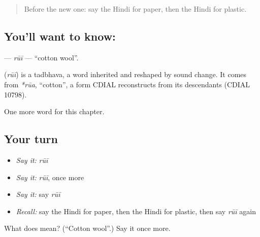 \label{lesson:HI-C246-rui}



\begin{quote}
Before the new one: say the Hindi for paper, then the Hindi for plastic.
\end{quote}

\subsection*{You'll want to know: }
\textbf{} — \emph{rūī} — \textquotedblleft{}cotton wool\textquotedblright{}.

\begin{cousinweb}
\textbf{} (\emph{rūī}) is a tadbhava, a word inherited and reshaped by sound change. It comes from \emph{*rūa}, \textquotedblleft{}cotton\textquotedblright{}, a form CDIAL reconstructs from its descendants (CDIAL 10798).
\end{cousinweb}

\begin{grammarlens}[title={What you've built}]
One more word for this chapter.
\end{grammarlens}

\subsection*{Your turn}
\begin{itemize}
\raggedright
  \item \emph{Say it:} \emph{rūī}
  \item \emph{Say it:} \emph{rūī}, once more
  \item \emph{Say it:} say \emph{rūī}
  \item \emph{Recall:} say the Hindi for paper, then the Hindi for plastic, then say \emph{rūī} again
\end{itemize}

\begin{tcolorbox}[breakable,colback=teal!4,colframe=teal!35!black,title={Before you move on}]
What does  mean? (\textquotedblleft{}Cotton wool\textquotedblright{}.) Say it once more.
\end{tcolorbox}
